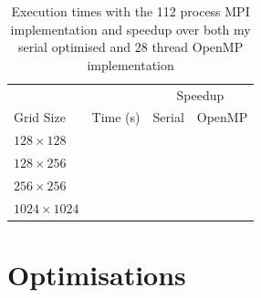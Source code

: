 \documentclass[twocolumn, a4paper]{article}
\begin{document}
\begin{table}[htbp]
  \begin{center}
  \caption{Execution times with the 112 process MPI implementation and speedup over both my serial optimised and 28 thread OpenMP implementation}\label{tab:mpi}
  \begin{tabular}[t]{l | l  l  l} 
      \hline\hline
      &&\multicolumn{2}{c}{Speedup}\\
      \cline{3-4}
      Grid Size&Time (s)&Serial&OpenMP\\
      \hline
      $128 \times 128$&\texttt{}&\texttt{}&\texttt{}\\
      $128 \times 256$&\texttt{}&\texttt{}&\texttt{}\\
      $256 \times 256$&\texttt{}&\texttt{}&\texttt{}\\
      $1024 \times 1024$&\texttt{}&\texttt{}&\texttt{}\\
      \hline
    \end{tabular}
  \end{center}
\end{table}

\section{Optimisations}



\end{document}
